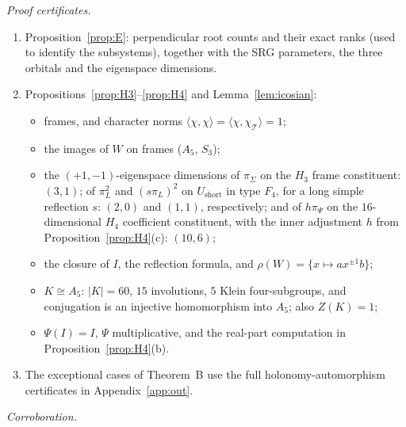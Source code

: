 \documentclass[11pt]{article}
\theoremstyle{definition}
\newcommand{\T}{\mathcal{T}}
\begin{document}
\emph{Proof certificates.}
\begin{enumerate}[label=(\arabic*)]
\item Proposition~\ref{prop:E}: perpendicular root counts and their exact ranks (used to identify the subsystems),
together with the SRG parameters, the three orbitals and the eigenspace dimensions.
\item Propositions~\ref{prop:H3}--\ref{prop:H4} and Lemma~\ref{lem:icosian}:
\begin{itemize}
\item frames, and character norms $\langle\chi,\chi\rangle=\langle\chi,\chi_\T\rangle=1$;
\item the images of $W$ on frames ($A_5$, $S_3$);
\item the $(+1,-1)$-eigenspace dimensions of $\pi_\Sigma$ on the $H_3$ frame constituent: $(3,1)$;
of $\pi_L^2$ and $(s\pi_L)^2$ on $U_{\mathrm{short}}$ in type $F_4$, for a long simple reflection $s$:
$(2,0)$ and $(1,1)$, respectively; and of $h\pi_\Psi$ on the $16$-dimensional $H_4$ coefficient constituent,
with the inner adjustment $h$ from Proposition~\ref{prop:H4}(c): $(10,6)$;
\item the closure of $I$, the reflection formula, and $\rho(W)=\{x\mapsto ax^{\pm1}b\}$;
\item $K\cong A_5$: $|K|=60$, $15$ involutions, $5$ Klein four-subgroups, and conjugation is an injective homomorphism
into $A_5$; also $Z(K)=1$;
\item $\Psi(I)=I$, $\Psi$ multiplicative, and the real-part computation in Proposition~\ref{prop:H4}(b).
\end{itemize}
\item The exceptional cases of Theorem~B use the full holonomy-automorphism certificates in Appendix~\ref{app:out}.
\end{enumerate}
\emph{Corroboration.}
\end{document}
